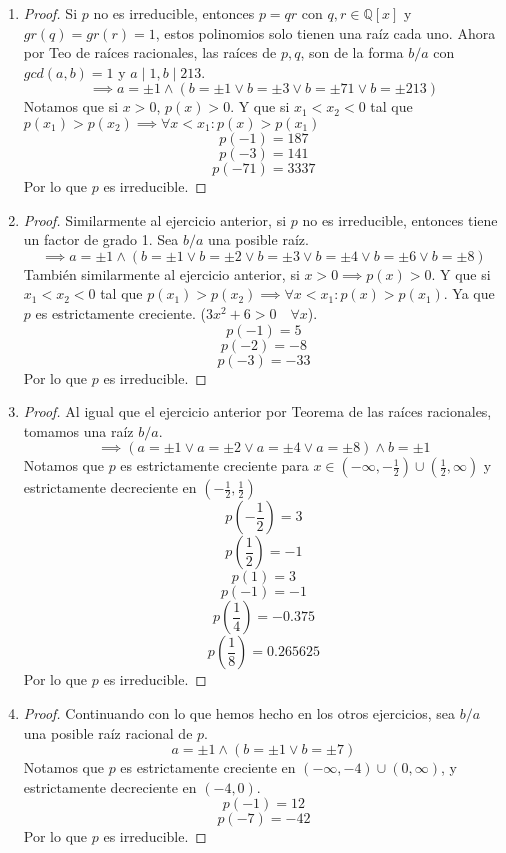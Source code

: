 \documentclass[11pt]{article}
\newcommand{\set}[1]{\mathbb{#1}}
\theoremstyle{definition}
\begin{document}
    \begin{enumerate}[label=\textbf{(\alph*)}]
        \item \begin{proof}
            Si $p$ no es irreducible, entonces $p=qr$ con $q,r\in\set{Q}[x]$ y $gr(q)=gr(r)=1$, estos polinomios solo tienen una raíz cada uno. Ahora por Teo de raíces racionales, las raíces de $p,q$, son de la forma $b/a$ con $gcd(a,b)=1$ y $a\mid 1, b\mid 213$.
            \[\implies a=\pm1\wedge(b=\pm1\vee b=\pm3\vee b=\pm71\vee b=\pm213)\]
            Notamos que si $x>0$, $p(x)>0$. Y que si $x_1<x_2<0$ tal que $p(x_1)>p(x_2)\implies \forall x<x_1:p(x)>p(x_1)$
            \[p(-1)=187\]
            \[p(-3)=141\]
            \[p(-71)=3337\]
            Por lo que $p$ es irreducible.
        \end{proof}

        \item \begin{proof}
            Similarmente al ejercicio anterior, si $p$ no es irreducible, entonces tiene un factor de grado 1. Sea $b/a$ una posible raíz.
            \[\implies a=\pm1\wedge(b=\pm1\vee b=\pm2\vee b=\pm3\vee b=\pm4\vee b=\pm6\vee b=\pm8)\]
            También similarmente al ejercicio anterior, si $x>0\implies p(x)>0$. Y que si $x_1<x_2<0$ tal que $p(x_1)>p(x_2)\implies \forall x<x_1:p(x)>p(x_1)$. Ya que $p$ es estrictamente creciente. ($3x^2+6>0\quad\forall x$).
            \[p(-1)=5\]
            \[p(-2)=-8\]
            \[p(-3)=-33\]
            Por lo que $p$ es irreducible.
        \end{proof}

        \item \begin{proof}
            Al igual que el ejercicio anterior por Teorema de las raíces racionales, tomamos una raíz $b/a$.
            \[\implies (a=\pm1\vee a=\pm2\vee a=\pm4\vee a=\pm8)\wedge b=\pm1\]
            Notamos que $p$ es estrictamente creciente para $x\in(-\infty,-\frac{1}{2})\cup(\frac{1}{2},\infty)$ y estrictamente decreciente en $(-\frac{1}{2},\frac{1}{2})$
            \[p\left(-\frac{1}{2}\right)=3\]
            \[p\left(\frac{1}{2}\right)=-1\]
            \[p(1)=3\]
            \[p(-1)=-1\]
            \[p\left(\frac{1}{4}\right)=-0.375\]
            \[p\left(\frac{1}{8}\right)=0.265625\]
            Por lo que $p$ es irreducible.
        \end{proof}

        \item \begin{proof}
            Continuando con lo que hemos hecho en los otros ejercicios, sea $b/a$ una posible raíz racional de $p$.
            \[a=\pm1\wedge(b=\pm1\vee b=\pm7)\]
            Notamos que $p$ es estrictamente creciente en $(-\infty,-4)\cup(0,\infty)$, y estrictamente decreciente en $(-4,0)$.
            \[p(-1)=12\]
            \[p(-7)=-42\]
            Por lo que $p$ es irreducible.
        \end{proof}


\end{enumerate}
\end{document}
